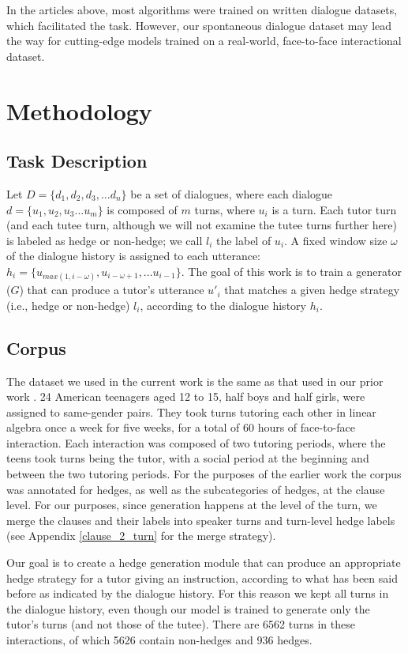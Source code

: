 \documentclass[11pt]{article}
\begin{document}
In the articles above, most algorithms were trained on written dialogue datasets, which facilitated the task. However, our spontaneous dialogue dataset may lead the way for cutting-edge models trained on a real-world, face-to-face interactional dataset.

\section{Methodology}
\subsection{Task Description}
Let $D=\{d_1,d_2,d_3,...d_n\}$ be a set of dialogues, where each dialogue $d=\{u_1, u_2, u_3...u_m\}$ is composed of $m$ turns, where $u_i$ is a turn. Each tutor turn (and each tutee turn, although we will not examine the tutee turns further here) is labeled as hedge or non-hedge; we call $l_i$ the label of $u_i$. A fixed window size $\omega$ of the dialogue history is assigned to each utterance: $h_i=\{u_{max(1, i-\omega)}, u_{i-\omega+1},...u_{i-1}\}$. The goal of this work is to train a generator ($G$) that can produce a tutor's utterance $u'_i$ that matches a given hedge strategy (i.e., hedge or non-hedge) $l_i$, according to the dialogue history $h_i$.

\subsection{Corpus}
The dataset we used in the current work is the same as that used in our prior work \citep{raphalen-etal-2022-might, goel2019a, zhao2014towards}. 24 American teenagers aged 12 to 15, half boys and half girls, were assigned to same-gender pairs. They took turns tutoring each other in linear algebra once a week for five weeks, for a total of 60 hours of face-to-face interaction. Each interaction was composed of two tutoring periods, where the teens took turns being the tutor, with a social period at the beginning and between the two tutoring periods. For the purposes of the earlier work the corpus was  annotated for hedges, as well as the subcategories of hedges, at the clause level. For our purposes, since generation happens at the level of the turn, we merge the clauses and their labels into speaker turns and turn-level hedge labels (see Appendix \ref{clause_2_turn} for the merge strategy).

Our goal is to create a hedge generation module that can produce an appropriate hedge strategy for a tutor giving an instruction, according to what has been said before as indicated by the dialogue history. For this reason we kept all turns in the dialogue history, even though our model is trained to generate only the tutor's turns (and not those of the tutee).  There are 6562 turns in these interactions, of which 5626 contain non-hedges and 936 hedges. 
\end{document}
